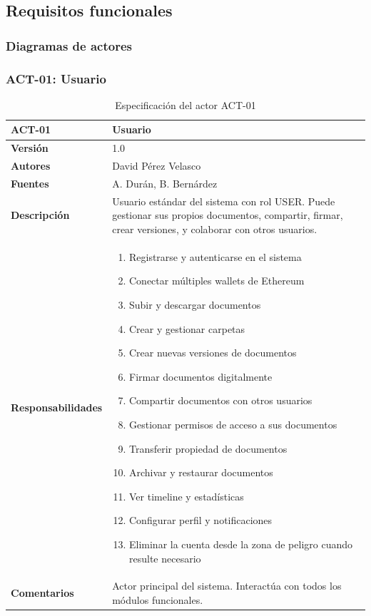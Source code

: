 \documentclass[11pt, a4paper]{article}
\begin{document}
\subsection{Requisitos funcionales}

\subsubsection{Diagramas de actores}

\subsubsection{ACT-01: Usuario}

\begin{table}[H]
    \centering
    \small
    \begin{tabular}{|p{4cm}|p{10cm}|}
    \hline
    \textbf{ACT-01} & Usuario \\
    \hline
    \textbf{Versión} & 1.0 \\
    \hline
    \textbf{Autores} & David Pérez Velasco \\
    \hline
    \textbf{Fuentes} & A. Durán, B. Bernárdez \\
    \hline
    \textbf{Descripción} & Usuario estándar del sistema con rol USER. Puede gestionar sus propios documentos, compartir, firmar, crear versiones, y colaborar con otros usuarios. \\
    \hline
    \textbf{Responsabilidades} & 
    \begin{enumerate}
        \item Registrarse y autenticarse en el sistema
        \item Conectar múltiples wallets de Ethereum
        \item Subir y descargar documentos
        \item Crear y gestionar carpetas
        \item Crear nuevas versiones de documentos
        \item Firmar documentos digitalmente
        \item Compartir documentos con otros usuarios
        \item Gestionar permisos de acceso a sus documentos
        \item Transferir propiedad de documentos
        \item Archivar y restaurar documentos
        \item Ver timeline y estadísticas
        \item Configurar perfil y notificaciones
        \item Eliminar la cuenta desde la zona de peligro cuando resulte necesario
    \end{enumerate} \\
    \hline
    \textbf{Comentarios} & Actor principal del sistema. Interactúa con todos los módulos funcionales. \\
    \hline
    \end{tabular}
    \caption{Especificación del actor ACT-01}
\end{table}
\end{document}
